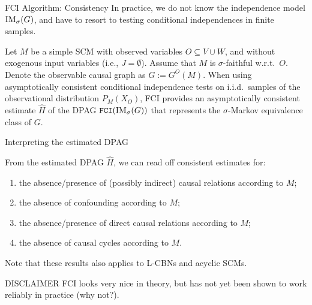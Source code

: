 \begin{frame}{FCI Algorithm: Consistency}
In practice, we do not know the independence model $\mathrm{IM}_\sigma(G)$, and have to resort to testing conditional independences in finite samples.
  \begin{Cor}
  Let $M$ be a simple SCM with observed variables $O \subseteq V \cup W$, and without exogenous input variables (i.e., $J = \emptyset$).
  Assume that $M$ is $\sigma$-faithful w.r.t.\ $O$.
  Denote the observable causal graph as $G := G^O(M)$.
  When using asymptotically consistent conditional independence tests on i.i.d.\ samples of the observational distribution $P_{M}(X_O)$, FCI provides an asymptotically consistent estimate $\hat{H}$ of the DPAG $\mathtt{FCI}(\mathrm{IM}_\sigma(G))$ that represents the $\sigma$-Markov equivalence class of $G$.
\end{Cor}
\end{frame}

\begin{frame}{Interpreting the estimated DPAG}
\begin{Cor}[continued]
From the estimated DPAG $\hat{H}$, we can read off consistent estimates for:
  \begin{enumerate}
  \item the absence/presence of (possibly indirect) causal relations according to $M$; 
  \item the absence of confounding according to $M$;
  \item the absence/presence of direct causal relations according to $M$;
  \item the absence of causal cycles according to $M$.
  \end{enumerate}
\end{Cor}
Note that these results also applies to L-CBNs and acyclic SCMs.

\bigskip
  \begin{block}{DISCLAIMER}
    FCI looks very nice in theory, but has not yet been shown to work reliably in practice (why not?).
  \end{block}
\end{frame}
